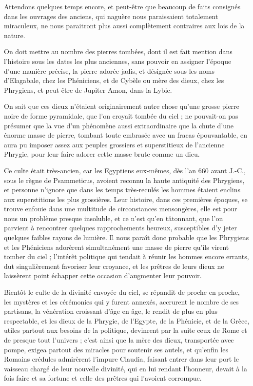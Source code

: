 \documentclass[a4paper, 12pt, oneside, french]{article}
\begin{document}
Attendons quelques temps encore, et peut-être que beaucoup de faits consignés dans les ouvrages des anciens, qui naguère nous paraissaient totalement miraculeux, ne nous paraitront plus aussi complètement contraires aux lois de la nature.

On doit mettre au nombre des pierres tombées, dont il est fait mention dans l'histoire sous les dates les plus anciennes, sans pouvoir en assigner l'époque d'une manière précise, la pierre adorée jadis, et désignée sous les noms d'Elagabale, chez les Phéniciens, et de Cybèle ou mère des dieux, chez les Phrygiens, et peut-être de Jupiter-Amon, dans la Lybie.

On sait que ces dieux n'étaient originairement autre chose qu'une grosse pierre noire de forme pyramidale, que l'on croyait tombée du ciel ; ne pouvait-on pas présumer que la vue d'un phénomène aussi extraordinaire que la chute d'une énorme masse de pierre, tombant toute embrasée avec un fracas épouvantable, en aura pu imposer assez aux peuples grossiers et superstitieux de l'ancienne Phrygie, pour leur faire adorer cette masse brute comme un dieu.

Ce culte était très-ancien, car les Egyptiens eux-mêmes, dès l'an 660 avant J.-C., sous le règne de Psammeticus, avoient reconnu la haute antiquité des Phrygiens, et personne n'ignore que dans les temps très-reculés les hommes étaient enclins aux superstitions les plus grossières. Leur histoire, dans ces premières époques, se trouve enfouie dans une multitude de circonstances mensongères, elle est pour nous un problème presque insoluble, et ce n'est qu'en tâtonnant, que l'on parvient à rencontrer quelques rapprochements heureux, susceptibles d'y jeter quelques faibles rayons de lumière. Il nous paraît donc probable que les Phrygiens et les Phéniciens adorèrent simultanément une masse de pierre qu'ils virent tomber du ciel ; l'intérêt politique qui tendait à réunir les hommes encore errants, dut singulièrement favoriser leur croyance, et les prêtres de leurs dieux ne laissèrent point échapper cette occasion d'augmenter leur pouvoir.

Bientôt le culte de la divinité envoyée du ciel, se répandit de proche en proche, les mystères et les cérémonies qui y furent annexés, accrurent le nombre de ses partisans, la vénération croissant d'âge en âge, le rendit de plus en plus respectable, et les dieux de la Phrygie, de l'Egypte, de la Phénicie, et de la Grèce, utiles partout aux besoins de la politique, devinrent par la suite ceux de Rome et de presque tout l'univers ; c'est ainsi que la mère des dieux, transportée avec pompe, exigea partout des miracles pour soutenir ses autels, et qu'enfin les Romains crédules admirèrent l'impure Claudia, faisant entrer dans leur port le vaisseau chargé de leur nouvelle divinité, qui en lui rendant l'honneur, devait à la fois faire et sa fortune et celle des prêtres qui l'avoient corrompue.
\end{document}
